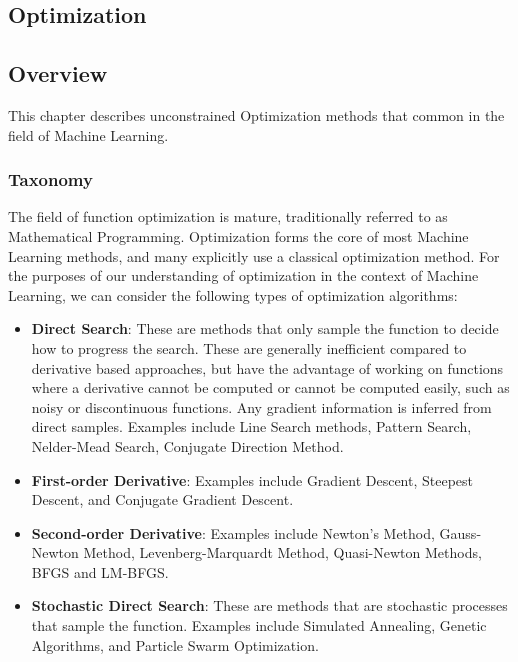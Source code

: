 

\renewcommand{\bibsection}{\subsection{\bibname}}
\begin{bibunit}

\chapter{Optimization}
\label{ch:optimization}

\section{Overview}
This chapter describes unconstrained Optimization methods that common in the field of Machine Learning.

\subsection{Taxonomy}
The field of function optimization is mature, traditionally referred to as Mathematical Programming. Optimization forms the core of most Machine Learning methods, and many explicitly use a classical optimization method. For the purposes of our understanding of optimization in the context of Machine Learning, we can consider the following types of optimization algorithms:

\begin{itemize}
	\item \textbf{Direct Search}: These are methods that only sample the function to decide how to progress the search. These are generally inefficient compared to derivative based approaches, but have the advantage of working on functions where a derivative cannot be computed or cannot be computed easily, such as noisy or discontinuous functions. Any gradient information is inferred from direct samples. Examples include Line Search methods, Pattern Search, Nelder-Mead Search, Conjugate Direction Method.
	\item \textbf{First-order Derivative}: Examples include Gradient Descent, Steepest Descent, and Conjugate Gradient Descent.
	\item \textbf{Second-order Derivative}: Examples include Newton's Method, Gauss-Newton Method, Levenberg-Marquardt Method, Quasi-Newton Methods, BFGS and LM-BFGS.
	\item \textbf{Stochastic Direct Search}: These are methods that are stochastic processes that sample the function. Examples include Simulated Annealing, Genetic Algorithms, and Particle Swarm Optimization.
\end{itemize}


\end{bibunit}
